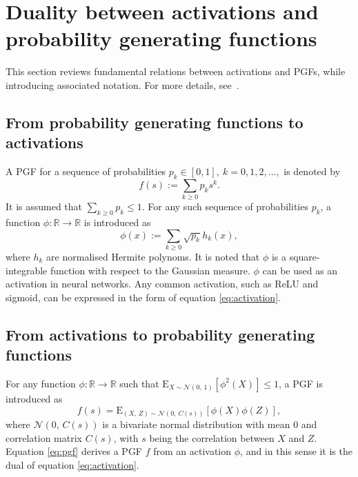 \documentclass[final, 12pt]{colt2021} %
\begin{document}
\section{Duality between activations and probability generating functions}
\label{activation_pgf_duality}

This section reviews fundamental relations between
activations and PGFs,
while introducing associated notation.
For more details, see~\cite{liang2021}.

\subsection{From probability generating functions to activations}

A PGF for a sequence of probabilities
$p_{k} \in[0, 1],~k=0, 1, 2,\ldots,$ is denoted by
\begin{equation}
\label{eq:pgf_def}
f(s)
:= \sum_{k\ge 0} p_k s^k.
\end{equation}
It is assumed that $\sum_{k \ge 0} p_k \le 1$.
For any such sequence of probabilities $p_{k}$,
a function
$\phi: \mathbb{R} \rightarrow \mathbb{R}$
is introduced as
\begin{equation}
\label{eq:activation}
\phi (x)
:= \sum_{k\ge 0} \sqrt {p_k} h_k(x),
\end{equation}
where $h_k$ are normalised Hermite polynoms.
It is noted that $\phi$ is
a square-integrable function with respect to the Gaussian measure.
$\phi$ can be used as an activation in neural networks.
Any common activation, such as ReLU and sigmoid,
can be expressed in the form of equation \eqref{eq:activation}.

\subsection{From activations to probability generating functions}
\label{sec:from_activation}

For any function
$\phi: \mathbb{R} \rightarrow \mathbb{R}$
such that
$\mbox{E}
_{X\sim\mathcal{N}(0,\,1)}
\left[
\phi^{2}(X)
\right] \le 1$,
a PGF is introduced as
\begin{equation}
\label{eq:pgf}
f(s)
= \mbox{E}
_{(X,\,Z)\sim\mathcal{N}(0,\,C(s))}
\left[
\phi (X)
\phi (Z)
\right],
\end{equation}
where $\mathcal{N}(0,\,C(s))$
is a bivariate normal distribution
with mean $0$ and
correlation matrix $C(s)$,
with $s$ being the correlation between $X$ and $Z$.
Equation \eqref{eq:pgf} derives
a PGF $f$ from an activation $\phi$,
and in this sense it is the dual of equation \eqref{eq:activation}.
\end{document}
